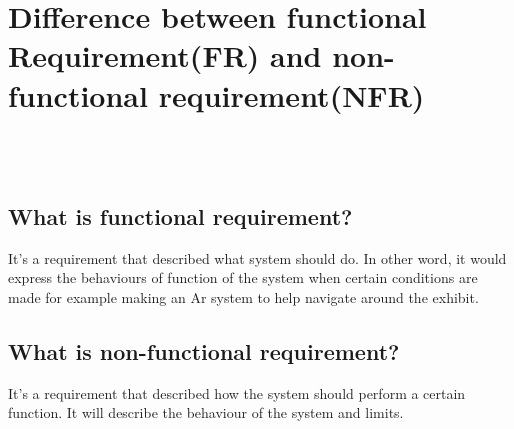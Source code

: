 

\section{Difference between functional Requirement(FR) and non-functional requirement(NFR)} \\\

\subsection{What is functional requirement?}
It's a requirement that described what system should do. In other word, it would express the behaviours of function of the system when certain conditions are made for example making an Ar system to help navigate around the exhibit.

\subsection{What is non-functional requirement?}
It's a requirement that described how the system should perform a certain function. It will describe the behaviour of the system and limits.

